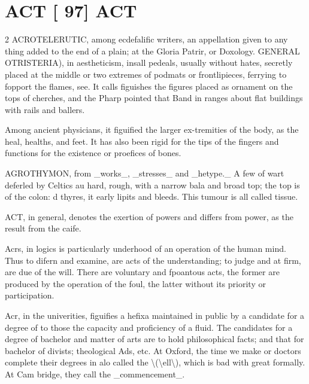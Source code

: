 \documentclass[10pt]{article}
\begin{document}
\section*{\centering ACT [ 97] ACT}
\begin{multicols}{2}\raggedcolumns
ACROTELERUTIC, among ecdefalific writers, an appellation given to any thing added to the end of a plain; at the Gloria Patrir, or Doxology. GENERAL OTRISTERIA), in aestheticism, insall pedeals, usually without hates, secretly placed at the middle or two extremes of podmats or frontlipieces, ferrying to fopport the flames, see. It calls figuishes the figures placed as ornament on the tops of cherches, and the Pharp pointed that Band in ranges about flat buildings with rails and ballers.

Among ancient physicians, it figuified the larger ex-tremities of the body, as the heal, healths, and feet. It has also been rigid for the tips of the fingers and functions for the existence or proefices of bones.

AGROTHYMON, from \_works\_, \_stresses\_ and \_hetype.\_ A few of wart deferled by Celtics au hard, rough, with a narrow bala and broad top; the top is of the colon: d thyres, it early lipits and bleeds. This tumour is all called tissue.

ACT, in general, denotes the exertion of powers and differs from power, as the result from the caife.

Acrs, in logics is particularly underhood of an operation of the human mind. Thus to difern and examine, are acts of the understanding; to judge and at firm, are due of the will. There are voluntary and fpoantous acts, the former are produced by the operation of the foul, the latter without its priority or participation.

Acr, in the univerities, figuifies a hefixa maintained in public by a candidate for a degree of to those the capacity and proficiency of a fluid. The candidates for a degree of bachelor and matter of arts are to hold philosophical facts; and that for bachelor of divists; theological Ads, etc. At Oxford, the time we make or doctors complete their degrees in alo called the \textbackslash{}(\textbackslash{}ell\textbackslash{}), which is bad with great formally. At Cam bridge, they call the \_commencement\_.


\end{multicols}
\end{document}
